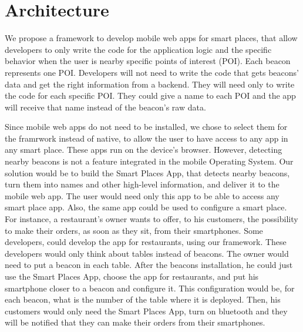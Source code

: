 
% 
% 

\section{Architecture}
\label{sec:architecture}
We propose a framework to develop mobile web apps for smart
places, that allow developers to only write the code
for the application logic and the specific behavior when
the user is nearby specific points of interest (POI).
Each beacon represents one POI. Developers will not need
to write the code that gets beacons' data and get the
right information from a backend. They will need only
to write the code for each specific POI. They could give
a name to each POI and the app will receive that name 
instead of the beacon's raw data. 

Since mobile web apps do not need to be installed, 
we chose to select
them for the framrwork instead of native, to allow
the user to have access to any app in any smart place.
These apps run on the device's browser. However, detecting
nearby beacons is not a feature integrated in the mobile
Operating System. Our solution would be to build the
Smart Places App,
that detects nearby beacons, turn them into names and
other high-level information, and deliver it to the
mobile web app. The user would need only this app to
be able to access any smart place app. Also, the same app
could be used to configure a smart place.
For instance, a restaurant's owner wants to offer, to
his customers, the possibility to make their orders,
as soon as they sit, from their smartphones. Some
developers, could develop the app for restaurants,
using our framework. These developers would only think
about tables instead of beacons. The owner would need
to put a beacon in each table. After the beacons
installation, he could just use the Smart Places App,
choose the app for restaurants, and put his smartphone
closer to a beacon and configure it. This configuration
would be, for each beacon, what is the number of the table
where it is deployed. Then, his customers would only
need the Smart Places App, turn on bluetooth and they will
be notified that they can make their orders from their
smartphones.

